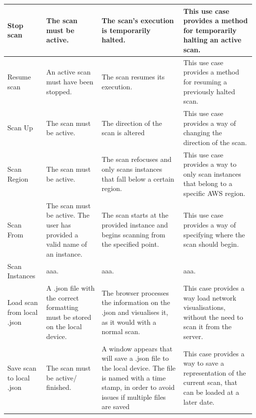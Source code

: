 \documentclass[a4paper,12pt]{report}
\begin{document}
\begin{center}
\begin{longtable}{| p{3cm} | p{4cm} | p{4cm} | p{4cm} |}
    Stop scan & The scan must be active. & The scan's execution is temporarily halted.  & This use case provides a method for temporarily halting an active scan.\\ \hline
    Resume scan & An active scan must have been stopped. & The scan resumes its execution. &  This use case provides a method for resuming a previously halted scan.\\ 
    \hline
	Scan Up & The scan must be active. & The direction of the scan is altered & This use case provides a way of changing the direction of the scan.\\ 
	\hline
    Scan Region & The scan must be active. & The scan refocuses and only scans instances that fall below a certain region. & This use case provides a way to only scan instances that belong to a specific AWS region.\\ \hline
    
    Scan From &  The scan must be active. The user has provided a valid name of an instance. & The scan starts at the provided instance and begins scanning from the specified point.  &  This use case provides a way of specifying where the scan should begin.\\ 
    \hline
    Scan Instances &  aaa. & aaa.  &  aaa.\\ 
    \hline
    
    Load scan from local .json & A .json file with the correct formatting must be stored on the local device. & The browser processes the information on the .json and visualises it, as it would with a normal scan. & This case provides a way load network visualisations, without the need to scan it from the server.\\ \hline
    Save scan to local .json & The scan must be active/ finished. & A window appears that will save a .json file to the local device. The file is named with a time stamp, in order to avoid issues if multiple files are saved & This case provides a way to save a representation of the current scan, that can be loaded at a later date.\\ 
    \hline
  \end{longtable}
\end{center}
\end{document}

